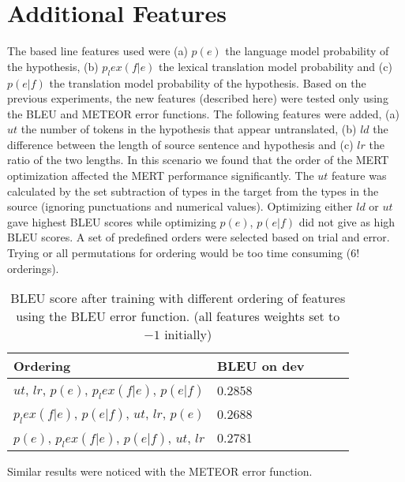\documentclass[11pt]{article}
\begin{document}
 \section{Additional Features}
 The based line features used were (a) $p(e)$ the language model probability of
 the hypothesis, (b) $p_lex(f|e)$ the lexical translation model probability and
 (c)  $p(e|f)$ the translation model probability of the hypothesis. Based on the
 previous experiments, the new features (described here) were tested only using the
  BLEU and METEOR error functions. The following features were added, (a) $ut$ the 
  number of tokens in the hypothesis that appear untranslated, (b) $ld$ the
  difference between the length of source sentence and hypothesis and (c) $lr$ the ratio of the two lengths. In this scenario we found
 that the order of the MERT optimization affected the MERT performance
 significantly. The $ut$ feature was calculated by the set subtraction of types
 in the target from the types in the source (ignoring punctuations and
 numerical values). Optimizing either $ld$ or $ut$ gave highest BLEU scores
 while optimizing $p(e)$, $p(e|f)$ did not give as high BLEU scores. A set of 
 predefined orders were selected based on trial and error. Trying or all
 permutations for ordering would be too time consuming ($6!$ orderings).
 \begin{table}[h]
\begin{center}
\begin{singlespace}
\begin{tabular}{|l|l|l|l|l|}
\hline \bf Ordering &  \bf BLEU on dev \\ \hline
$ut$, $lr$, $p(e)$, $p_lex(f|e)$, $p(e|f)$ & 0.2858 \\
$p_lex(f|e)$, $p(e|f)$, $ut$, $lr$, $p(e)$  & 0.2688 \\
$p(e)$, $p_lex(f|e)$, $p(e|f)$, $ut$, $lr$ & 0.2781\\
\hline
\end{tabular}
\end{singlespace}
\end{center}
\caption{ BLEU score after training with different ordering of features using
the BLEU error function. (all features weights set to $-1$ initially)}
\end{table}
Similar results were noticed with the METEOR error function.\\
\end{document}

